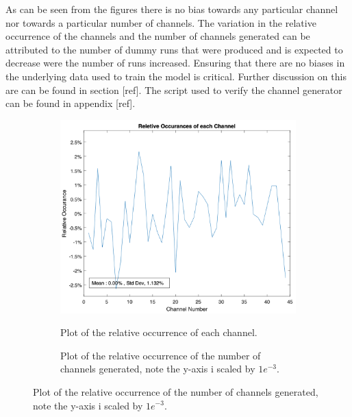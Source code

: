 As can be seen from the figures there is no bias towards any particular channel nor towards a particular number of channels. The variation in the relative occurrence of the channels and the number of channels generated can be attributed to the number of dummy runs that were produced and is expected to decrease were the number of runs increased. Ensuring that there are no biases in the underlying data used to train the model is critical. Further discussion on this are can be found in section [ref]. The script used to verify the channel generator can be found in appendix [ref].
\begin{figure}
    \centering
    \caption{Results of 5000 dummy runs of the channel generator.}
    \label{fig:tw:dummy_runs}
    \begin{subfigure}{0.49\textwidth}
        \centering
    \caption{Plot of the relative occurrence of each channel.}
    \includegraphics[width=\textwidth]{images/technical_work/section_2_data generation/rel_occur_ch.png}
    \label{fig:tw:data_gen:rel_ch}    
    \end{subfigure}
    \begin{subfigure}{0.49\textwidth}
        \centering
        \caption{Plot of the relative occurrence of the number of channels generated, note the y-axis i scaled by $1e^{-3}$.}

\end{subfigure}
\end{figure}
